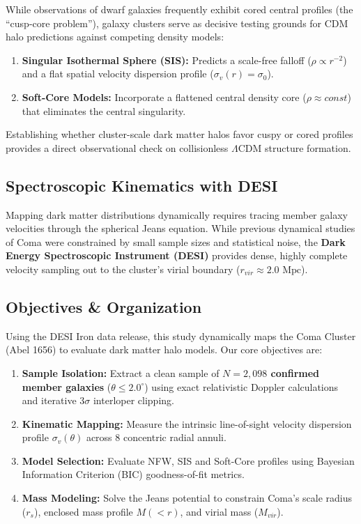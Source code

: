 \documentclass[twocolumn]{aastex631}
\begin{document}
While observations of dwarf galaxies frequently exhibit cored central profiles (the ``cusp-core problem''), galaxy clusters serve as decisive testing grounds for CDM halo predictions against competing density models:

\begin{enumerate}
	\item \textbf{Singular Isothermal Sphere (SIS):} Predicts a scale-free falloff ($\rho\propto r^{-2}$) and a flat spatial velocity dispersion profile ($\sigma_{v}(r)=\sigma_{0}$).
	\item \textbf{Soft-Core Models:} Incorporate a flattened central density core ($\rho \approx const$) that eliminates the central singularity.
\end{enumerate}

Establishing whether cluster-scale dark matter halos favor cuspy or cored profiles provides a direct observational check on collisionless $\Lambda\text{CDM}$ structure formation.

\subsection{Spectroscopic Kinematics with DESI}
Mapping dark matter distributions dynamically requires tracing member galaxy velocities through the spherical Jeans equation. While previous dynamical studies of Coma were constrained by small sample sizes and statistical noise, the \textbf{Dark Energy Spectroscopic Instrument (DESI)} provides dense, highly complete velocity sampling out to the cluster's virial boundary ($r_{vir} \approx 2.0 \text{ Mpc}$).

\subsection{Objectives \& Organization}

Using the DESI Iron data release, this study dynamically maps the Coma Cluster (Abel 1656) to evaluate dark matter halo models. Our core objectives are:

\begin{enumerate}
	\item \textbf{Sample Isolation:} Extract a clean sample of \textbf{$N=2,098$ confirmed member galaxies} ($\theta \leq 2.0^{\circ}$)  using exact relativistic Doppler calculations and iterative $3\sigma$ interloper clipping.

	\item \textbf{Kinematic Mapping:} Measure the intrinsic line-of-sight velocity dispersion profile $\sigma_{v}(\theta)$ across 8 concentric radial annuli.

	\item \textbf{Model Selection:} Evaluate NFW, SIS and Soft-Core profiles using Bayesian Information Criterion (BIC) goodness-of-fit metrics.

	\item \textbf{Mass Modeling:} Solve the Jeans potential to constrain Coma's scale radius ($r_{s}$), enclosed mass profile $M(<r)$, and virial mass ($M_{vir}$).

\end{enumerate}
\end{document}
